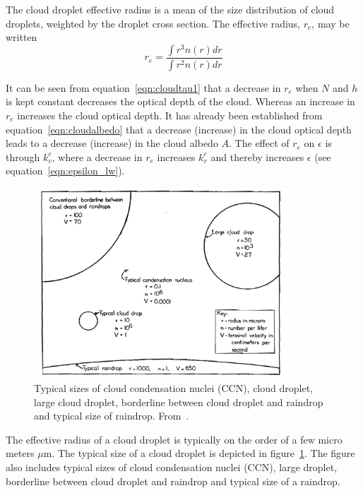 The cloud droplet effective radius is a mean of the size distribution of cloud droplets, weighted by the droplet cross section. The effective radius, $r_e$, may be written
\begin{equation}
r_e = \frac{\int r^3 n(r) dr}{\int r^2 n(r) dr}
\label{eqn:re}
\end{equation}

It can be seen from equation~\ref{eqn:cloudtau1} that a decrease in $r_e$ when $N$ and $h$ is kept constant decreases the optical depth of the cloud. Whereas an increase in $r_e$ increases the cloud optical depth. It has already been established from equation~\ref{eqn:cloudalbedo} that a decrease (increase) in the cloud optical depth leads to a decrease (increase) in the cloud albedo $A$. The effect of $r_e$ on $\epsilon$ is through $k_v^c$, where a decrease in $r_e$ increases $k_v^c$ and thereby increases $\epsilon$ (see equation~\ref{eqn:epsilon_lw}).

\begin{figure}
\centering
\includegraphics[width=0.85\textwidth]{theory/dropletsize.png}
\caption{Typical sizes of cloud condensation nuclei (CCN), cloud droplet, large cloud droplet, borderline between cloud droplet and raindrop and typical size of raindrop. %
From~\citep{McDonald1958}.}
\label{fig:dropletsize}
\end{figure}

The effective radius of a cloud droplet is typically on the order of a few micro meters $\mu\text{m}$. The typical size of a cloud droplet is depicted in figure~\ref{fig:dropletsize}. The figure also includes typical sizes of cloud condensation nuclei (CCN), large droplet, borderline between cloud droplet and raindrop and typical size of a raindrop.


